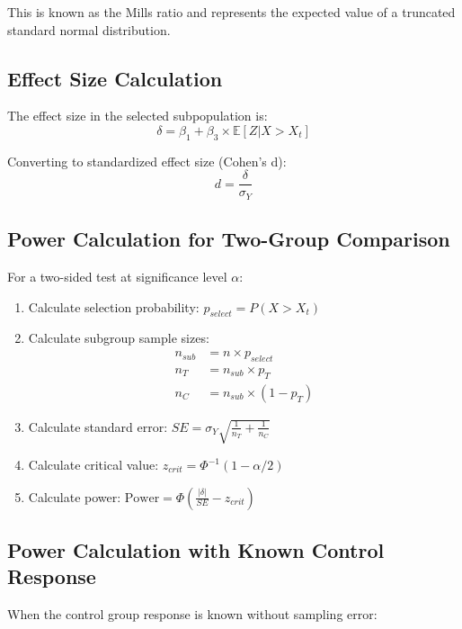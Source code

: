 \documentclass{article}
\begin{document}
This is known as the Mills ratio and represents the expected value of a truncated standard normal distribution.

\subsection{Effect Size Calculation}

The effect size in the selected subpopulation is:
\begin{equation}
\delta = \beta_1 + \beta_3 \times \mathbb{E}[Z|X > X_t]
\end{equation}

Converting to standardized effect size (Cohen's d):
\begin{equation}
d = \frac{\delta}{\sigma_Y}
\end{equation}

\subsection{Power Calculation for Two-Group Comparison}

For a two-sided test at significance level $\alpha$:

\begin{enumerate}
    \item Calculate selection probability: $p_{select} = P(X > X_t)$
    \item Calculate subgroup sample sizes:
    \begin{align}
        n_{sub} &= n \times p_{select} \\
        n_T &= n_{sub} \times p_T \\
        n_C &= n_{sub} \times (1-p_T)
    \end{align}
    \item Calculate standard error: $SE = \sigma_Y \sqrt{\frac{1}{n_T} + \frac{1}{n_C}}$
    \item Calculate critical value: $z_{crit} = \Phi^{-1}(1-\alpha/2)$
    \item Calculate power: $\text{Power} = \Phi\left(\frac{|\delta|}{SE} - z_{crit}\right)$
\end{enumerate}

\subsection{Power Calculation with Known Control Response}

When the control group response is known without sampling error:
\end{document}
